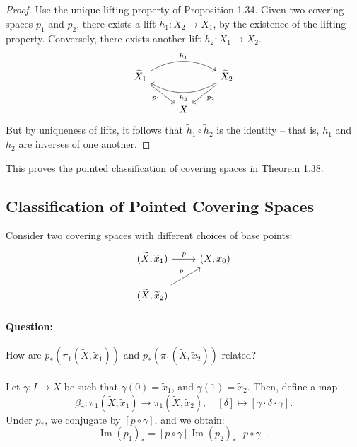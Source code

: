 \documentclass[a4paper]{report}
\theoremstyle{definition}
\theoremstyle{remark}
\theoremstyle{proposition}
\theoremstyle{conjecture}
\theoremstyle{lemma}
\theoremstyle{corollary}
\theoremstyle{exercise}
\newcommand{\on}{\operatorname}
\begin{document}
\begin{proof}
    Use the unique lifting property of Proposition 1.34. Given two covering spaces 
    $p_1$ and $p_2$, there exists a lift $\widetilde{h}_1 : \widetilde{X}_2 \to \widetilde{X}_1$, 
    by the existence of the lifting property.
    Conversely, there exists another lift $\widetilde{h}_2 : \widetilde{X}_1 \to \widetilde{X}_2$. 
    $$\begin{tikzcd}
        \widetilde{X}_1 \arrow[rd, "p_1"'] \arrow[rr, "h_1", bend left] &   & \widetilde{X}_2 \arrow[ld, "p_2"] \arrow[ll, "h_2", bend left] \\
                                                                        & X &                                                               
    \end{tikzcd}$$
    But by uniqueness of lifts, it follows that $\widetilde{h}_1 \circ \widetilde{h}_2$ is the identity 
    -- that is, $h_1$ and $h_2$ are inverses of one another.
\end{proof}

This proves the pointed classification of covering spaces in Theorem 1.38. 

\subsection{Classification of Pointed Covering Spaces}

Consider two covering spaces with different choices of base points:
$$\begin{tikzcd}
    {(\widetilde{X}, \widetilde{x}_1)} \arrow[r, "p"] & (X,x_0) \\
    {(\widetilde{X},\widetilde{x}_2)} \arrow[ru, "p"] &  
\end{tikzcd}$$
\paragraph{Question:} How are $p_\ast(\pi_1(\widetilde{X},\widetilde{x}_1))$ and 
$p_\ast(\pi_1(\widetilde{X},\widetilde{x}_2))$ related?\\\\
Let $\gamma : I \to \widetilde{X}$ be such that $\gamma(0) = \widetilde{x}_1$, 
and $\gamma(1) = \widetilde{x}_2$. Then, define a map 
$$\beta_\gamma : \pi_1(\widetilde{X}, \widetilde{x}_1) \longrightarrow \pi_1(\widetilde{X}, \widetilde{x}_2), \quad [\delta] \longmapsto [\overline{\gamma} \cdot \delta \cdot \gamma].$$
Under $p_\ast$, we conjugate by $[p \circ \gamma]$, and we obtain:
$$\on{Im}(p_1)_\ast = [p\circ \overline{\gamma}] \on{Im}(p_2)_\ast [p\circ \gamma].$$
\end{document}
